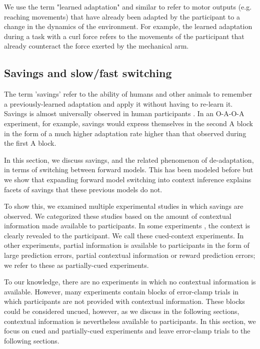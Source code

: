 \documentclass[a4paper,doc,floatsintext,natbib]{apa6}
\begin{document}
We use the term "learned adaptation" and similar to refer to motor outputs (e.g. reaching movements) that have already been adapted by the participant to a change in the dynamics of the environment. For example, the learned adaptation during a task with a curl force refers to the movements of the participant that already counteract the force exerted by the mechanical arm.

\subsection{Savings and slow/fast switching}
The term 'savings' refer to the ability of humans and other animals to remember a previously-learned adaptation and apply it without having to re-learn it. Savings is almost universally observed in human participants \cite{Brashers-Krug_Consolidation_1996,Shadmehr_Functional_1997,Medina_Mechanism_2001,Smith_Interacting_2006,Zarahn_Explaining_2008}. In an O-A-O-A experiment, for example, savings would express themselves in the second A block in the form of a much higher adaptation rate higher than that observed during the first A block.

In this section, we discuss savings, and the related phenomenon of de-adaptation, in terms of switching between forward models. This has been modeled before \citep[e.g.][]{Wolpert_Multiple_1998,Oh_Minimizing_2019,Imamizu_Explicit_2007} but we show that expanding forward model switching into context inference explains facets of savings that these previous models do not.

To show this, we examined multiple experimental studies in which savings are observed. We categorized these studies based on the amount of contextual information made available to participants. In some experiments \citep[e.g.][]{Kim_Neural_2015,Lee_Dual_2009}, the context is clearly revealed to the participant. We call these cued-context experiments. In other experiments, partial information is available to participants \citep[e.g.][]{Davidson_Scaling_2004,Zarahn_Explaining_2008} in the form of large prediction errors, partial contextual information or reward prediction errors; we refer to these as partially-cued experiments.

To our knowledge, there are no experiments in which no contextual information is available. However, many experiments \citep[e.g.][]{Huang_Persistence_2009,Brennan_Decay_2015,Smith_Interacting_2006} contain blocks of error-clamp trials in which participants are not provided with contextual information. These blocks could be considered uncued, however, as we discuss in the following sections, contextual information is nevertheless available to participants. In this section, we focus on cued and partially-cued experiments and leave error-clamp trials to the following sections.
\end{document}
